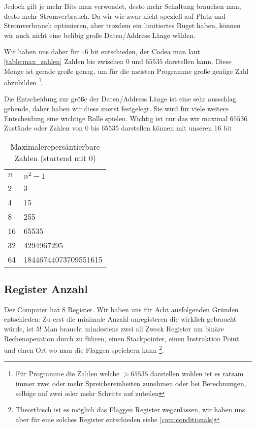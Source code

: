 \documentclass{scrartcl}
\begin{document}
Jedoch gilt je mehr Bits man verwendet, desto mehr Schaltung brauchen man, desto mehr Stromverbrauch. Da wir wie zwar nicht speziell auf Platz und Stromverbrauch optimieren, aber trozdem ein limitiertes Buget haben, können wir auch nicht eine belibig große Daten/Address Länge wählen.

Wir haben uns daher für $16$ bit entschieden, der Codea man laut \autoref{table:max_zahlen} Zahlen bis zwischen $0$ und $65535$ darstellen kann. Diese Menge ist gerade große genug, um für die meisten Programme große genüge Zahl abzubilden
\footnote{Für Programme die Zahlen welche $> 65535$ darstellen wohlen ist es ratsam immer zwei oder mehr Spreichereinheiten zunehmen oder bei Berechnungen, selbige auf zwei oder mehr Schritte auf zuteilen}.

Die Entscheidung zur größe der Daten/Address Länge ist eine sehr ausschlag gebende, daher haben wir diese zuerst festgelegt. Sie wird für viele weitere Entscheidung eine wichtige Rolle spielen. Wichtig ist nur das wir maximal $65536$ Zustände oder Zahlen von $0$ bis $65535$ darstellen können mit unseren $16$ bit

\begin{center}
	\begin{table}[h]
		\caption{\label{table:max_zahlen} Maximalerepersäntierbare Zahlen (startend mit 0)}
		\begin{tabular}{ l | l }
 		$n$ & $n^2 - 1$ \\
		\hline 
		2 & 3\\  
		4 & 15\\
		8 & 255\\
		16 & 65535\\
 		32 & 4294967295\\
 		64 & 18446744073709551615\\
		\end{tabular}
	\end{table}
\end{center}

\subsection{\label{section:comment:register_number}Register Anzahl}

Der Computer hat 8 Register. Wir haben uns für Acht ausfolgenden Gründen entschieden:
Zu erst die minimale Anzahl anregisteren die wirklich gebraucht würde, ist $5$! Man braucht mindestens zwei all Zweck Register um binäre Rechenoperation durch zu führen, einen Stackpointer, einen Instruktion Point und einen Ort wo man die Flaggen speichern kann
\footnote{Theorthisch ist es möglich das Flaggen Register wegzulassen, wir haben uns aber für eine solches Register entschieden siehe \autoref{com:conditionals}}.
\end{document}
